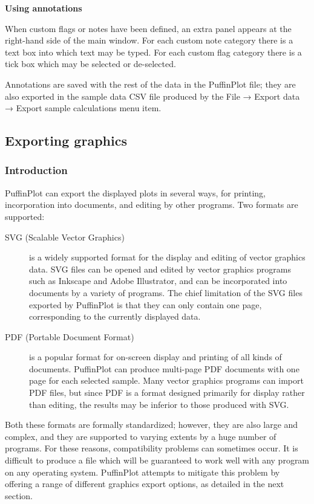 \documentclass[a4paper,british]{article}
\newcommand{\ppcmd}[1]{\textsf{#1}} %
\newcommand{\caps}[1]{\MakeTextUppercase{#1}} %
\newcommand{\submenu}{ \textrm{→} }
\newcommand{\mypara}[1]{\noindent\textbf{#1}

\noindent\ignorespaces} %
\begin{document}
\mypara{Using annotations}When custom flags or notes have been defined,
an extra panel appears at the right-hand side of the main window. For
each custom note category there is a text box into which text may be
typed. For each custom flag category there is a tick box which may be
selected or de-selected.

Annotations are saved with the rest of the data in the PuffinPlot file; they
are also exported in the sample data \caps{csv} file produced by the
\ppcmd{File\submenu Export data\submenu Export sample calculations} menu
item.

\subsection{\label{sec:graphics-export}Exporting graphics}

\subsubsection{Introduction}

PuffinPlot can export the displayed plots in several ways, for printing,
incorporation into documents, and editing by other programs. Two formats are
supported:

\begin{description}

\item[SVG (Scalable Vector Graphics)] is a widely supported format for the
  display and editing of vector graphics data. SVG files can be opened and
  edited by vector graphics programs such as Inkscape and Adobe Illustrator,
  and can be incorporated into documents by a variety of programs. The chief
  limitation of the SVG files exported by PuffinPlot is that they can
  only contain one page, corresponding to the currently displayed data.

\item[PDF (Portable Document Format)] is a popular format for on-screen
  display and printing of all kinds of documents. PuffinPlot can produce
  multi-page PDF documents with one page for each selected sample.
  Many vector graphics programs can import PDF files, but since PDF is 
  a format designed primarily for display rather than editing, the results
  may be inferior to those produced with SVG.

\end{description}

Both these formats are formally standardized; however, they are also large
and complex, and they are supported to varying extents by a huge number of
programs. For these reasons, compatibility problems can sometimes occur. It
is difficult to produce a file which will be guaranteed to work well with any
program on any operating system. PuffinPlot attempts to mitigate this problem
by offering a range of different graphics export options, as detailed in the
next section.
\end{document}
